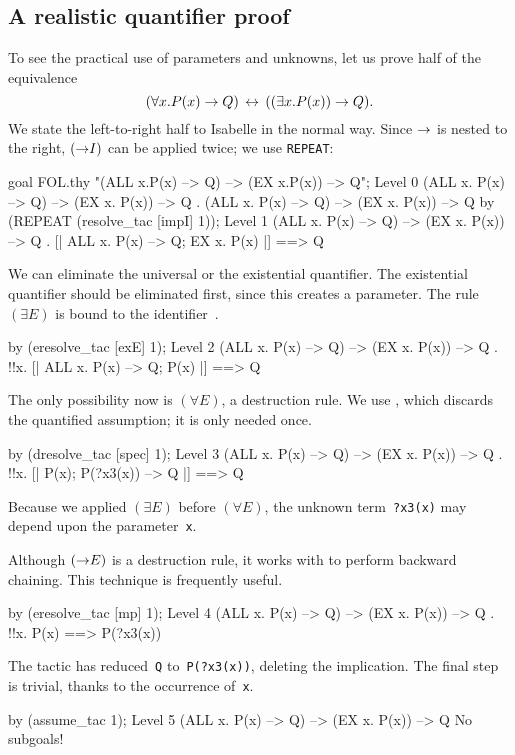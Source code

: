 \subsection{A realistic quantifier proof}
To see the practical use of parameters and unknowns, let us prove half of
the equivalence 
\[ (\forall x. P(x) \rightarrow Q) \,\leftrightarrow\, ((\exists x. P(x)) \rightarrow Q). \]
We state the left-to-right half to Isabelle in the normal way.
Since $\rightarrow$ is nested to the right, $({\rightarrow}I)$ can be applied twice; we
use {\tt REPEAT}:
\begin{ttbox}
goal FOL.thy "(ALL x.P(x) --> Q) --> (EX x.P(x)) --> Q";
{\out Level 0}
{\out (ALL x. P(x) --> Q) --> (EX x. P(x)) --> Q}
{. (ALL x. P(x) --> Q) --> (EX x. P(x)) --> Q}
\ttbreak
by (REPEAT (resolve_tac [impI] 1));
{\out Level 1}
{\out (ALL x. P(x) --> Q) --> (EX x. P(x)) --> Q}
{. [| ALL x. P(x) --> Q; EX x. P(x) |] ==> Q}
\end{ttbox}
We can eliminate the universal or the existential quantifier.  The
existential quantifier should be eliminated first, since this creates a
parameter.  The rule~$(\exists E)$ is bound to the
identifier~.
\begin{ttbox}
by (eresolve_tac [exE] 1);
{\out Level 2}
{\out (ALL x. P(x) --> Q) --> (EX x. P(x)) --> Q}
{. !!x. [| ALL x. P(x) --> Q; P(x) |] ==> Q}
\end{ttbox}
The only possibility now is $(\forall E)$, a destruction rule.  We use 
, which discards the quantified assumption; it is
only needed once.
\begin{ttbox}
by (dresolve_tac [spec] 1);
{\out Level 3}
{\out (ALL x. P(x) --> Q) --> (EX x. P(x)) --> Q}
{. !!x. [| P(x); P(?x3(x)) --> Q |] ==> Q}
\end{ttbox}
Because we applied $(\exists E)$ before $(\forall E)$, the unknown
term~{\tt?x3(x)} may depend upon the parameter~{\tt x}.

Although $({\rightarrow}E)$ is a destruction rule, it works with 
 to perform backward chaining.  This technique is
frequently useful.  
\begin{ttbox}
by (eresolve_tac [mp] 1);
{\out Level 4}
{\out (ALL x. P(x) --> Q) --> (EX x. P(x)) --> Q}
{. !!x. P(x) ==> P(?x3(x))}
\end{ttbox}
The tactic has reduced~{\tt Q} to~{\tt P(?x3(x))}, deleting the
implication.  The final step is trivial, thanks to the occurrence of~{\tt x}.
\begin{ttbox}
by (assume_tac 1);
{\out Level 5}
{\out (ALL x. P(x) --> Q) --> (EX x. P(x)) --> Q}
{\out No subgoals!}
\end{ttbox}


